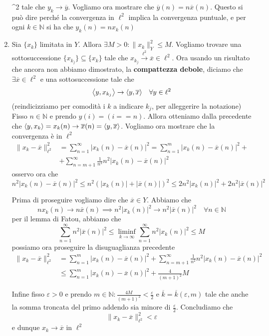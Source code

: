 \begin{eser}{}
\begin{enumerate}[label = \arabic*.]
         \in \ell^2\) tale che \(y_k \to \overline{y}\). Vogliamo
        ora mostrare che \(\overline{y}{(n)} = n \overline{x}{(n)}\). Questo si
        può dire perché la convergenza in \(\ell^2\) implica la convergenza
        puntuale, e per ogni \(k \in \mathbb{N}\) si ha che \(y_k{(n)} = n x_k{(n)}\)
    \item Sia \(\{x_k\} \) limitata in \(Y\). Allora \(\exists M > 0:
        \|x_k\|_Y^2 \le M\). Vogliamo trovare una sottosuccessione \(\{ x_{k_{j}}\} \subseteq \{x_k\} \) tale che \(x_{k_{j}} \overset{\ell^2}{\to } \overline{x} \in \ell^2\). Ora usando un risultato che ancora non abbiamo dimostrato, la \textbf{compattezza debole}, diciamo che \(\exists \overline{x} \in \ell^2\) e una sottosuccessione tale che
        \[
          {\left\langle y, x_{k_{j}} \right\rangle} \to {\left\langle y, \overline{x}\right\rangle} \quad \forall y \in
          \ell^2
        \]
    (reindicizziamo per comodità i \(k\) a indicare \(k_j\), per alleggerire la
    notazione)
    Fisso \(n \in \mathbb{N}\) e prendo \(y{(i)} = {(i == n)}\). Allora
    otteniamo dalla precedente che \({\left\langle y, x_k \right\rangle} = x_k{(n)} \to \overline{x}{(n)} = {\left\langle y, \overline{x}\right\rangle} \). Vogliamo ora mostrare che la convergenza è in \(\ell^2\) 
    \begin{align*}
        \|x_k - \overline{x}\|^2_{\ell^2} &= \sum_{n=1}^{\infty} |x_k{(n)} - \overline{x}{(n)}|^2 = \sum_{n=1}^{m} |x_k{(n)} - \overline{x}{(n)}|^2 + \\ &+ \sum_{n=m+1}^{\infty} \frac{1}{n^2} n^2 | x_k{(n)} - \overline{x}{(n)}|^2
    \end{align*}
    osservo ora che \(n^2 | x_k{(n)} - \overline{x}{(n)}|^2 \le  n^2 {( | x_k{(n)}| + |\overline{x}{(n)}| )}^2 \le  2 n^2 |x_k{(n)}|^2 + 2n^2 |\overline{x}{(n)}|^2\) 

    Prima di proseguire vogliamo dire che \(\overline{x} \in Y\). Abbiamo che
    \[
      nx_k{(n)} \to n\overline{x}{(n)} \implies n^2 |x_k{(n)}|^2 \to n^2 |\overline{x}{(n)}|^2 \quad \forall n \in \mathbb{N}
    \]
    per il lemma di Fatou, abbiamo che
    \[
      \sum_{n=1}^{\infty} n^2 | \overline{x}{(n)}|^2 \le \liminf_{k \to \infty}
      \sum_{n=1}^{\infty} n^2 | x_k{(n)}|^2 \le M
    \]
    possiamo ora proseguire la disuguaglianza precedente
    \begin{align*}
        \|x_k - \overline{x}\|^2_{\ell^2} &= \sum_{n=1}^{m} |x_k{(n)} - \overline{x}{(n)}|^2 +  \sum_{n=m+1}^{\infty} \frac{1}{n^2} n^2 | x_k{(n)} - \overline{x}{(n)}|^2 \\ &\le \sum_{n=1}^{m} |x_k{(n)} - \overline{x}{(n)}|^2 + \frac{4}{{(m+1)}^2 } M 
    \end{align*}

    Infine fisso \(\varepsilon > 0\) e prendo \(m \in \mathbb{N} : \frac{4M}{{(m+1)}^2} < \frac{\varepsilon}{2}\) e \(\overline{k} = \overline{k}{(\varepsilon, m)}\) tale che anche la somma troncata del primo addendo sia minore di \(\frac{\varepsilon}{2}\). Concludiamo che
    \[
      \|x_k - \overline{x}\|^2_{\ell^2} < \varepsilon
    \]
    e dunque \(x_k \to \overline{x}\) in \(\ell^2\) 
\end{enumerate}
\label{eser:Y}
\end{eser}
